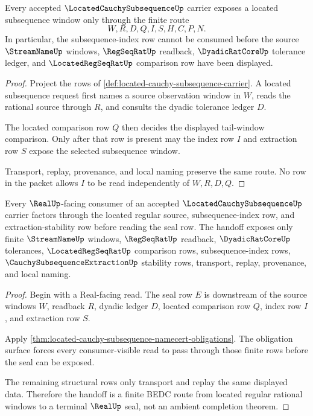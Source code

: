 \begin{theorem}
\label{thm:located-cauchy-subsequence-located-window-exposure}
Every accepted $\LocatedCauchySubsequenceUp$ carrier exposes a located subsequence window only through the finite route
$$
W,R,D,Q,I,S,H,C,P,N.
$$
In particular, the subsequence-index row cannot be consumed before the source $\StreamNameUp$ windows, $\RegSeqRatUp$ readback, $\DyadicRatCoreUp$ tolerance ledger, and $\LocatedRegSeqRatUp$ comparison row have been displayed.
\end{theorem}
\begin{proof}
Project the rows of \autoref{def:located-cauchy-subsequence-carrier}. A located subsequence request first names a source observation window in $W$, reads the rational source through $R$, and consults the dyadic tolerance ledger $D$.

The located comparison row $Q$ then decides the displayed tail-window comparison. Only after that row is present may the index row $I$ and extraction row $S$ expose the selected subsequence window.

Transport, replay, provenance, and local naming preserve the same route. No row in the packet allows $I$ to be read independently of $W,R,D,Q$.
\end{proof}

\begin{theorem}
\label{thm:located-cauchy-subsequence-realup-handoff}
Every $\RealUp$-facing consumer of an accepted $\LocatedCauchySubsequenceUp$ carrier factors through the located regular source, subsequence-index row, and extraction-stability row before reading the seal row. The handoff exposes only finite $\StreamNameUp$ windows, $\RegSeqRatUp$ readback, $\DyadicRatCoreUp$ tolerances, $\LocatedRegSeqRatUp$ comparison rows, subsequence-index rows, $\CauchySubsequenceExtractionUp$ stability rows, transport, replay, provenance, and local naming.
\end{theorem}
\begin{proof}
Begin with a Real-facing read. The seal row $E$ is downstream of the source windows $W$, readback $R$, dyadic ledger $D$, located comparison row $Q$, index row $I$, and extraction row $S$.

Apply \autoref{thm:located-cauchy-subsequence-namecert-obligations}. The obligation surface forces every consumer-visible read to pass through those finite rows before the seal can be exposed.

The remaining structural rows only transport and replay the same displayed data. Therefore the handoff is a finite BEDC route from located regular rational windows to a terminal $\RealUp$ seal, not an ambient completion theorem.
\end{proof}

